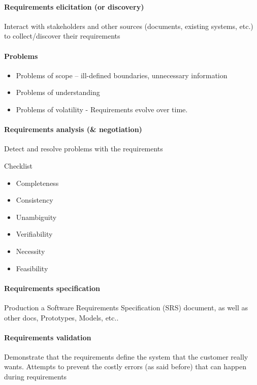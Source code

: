 \documentclass[../ESOF_notes.tex]{subfiles}
\begin{document}
\paragraph{Requirements elicitation (or discovery)}

Interact with stakeholders and other sources (documents, existing systems, etc.) to collect/discover their requirements

\paragraph{Problems}

\begin{itemize}
    \item Problems of scope – ill-defined boundaries, unnecessary information
    \item Problems of understanding
    \item Problems of volatility - Requirements evolve over time.
\end{itemize}

\paragraph{Requirements analysis (\& negotiation)}

Detect and resolve problems with the requirements

Checklist
\begin{itemize}
    \item Completeness
    \item Consistency
    \item Unambiguity
    \item Verifiability
    \item Necessity
    \item Feasibility
\end{itemize}

\paragraph{Requirements specification}
Production a Software Requirements Specification (SRS) document, as well as other docs, Prototypes, Models, etc..

\paragraph{Requirements validation}

Demonstrate that the requirements define the system that the customer really wants. Attempts to prevent the costly errors (as said before) that can happen during requirements
\end{document}
